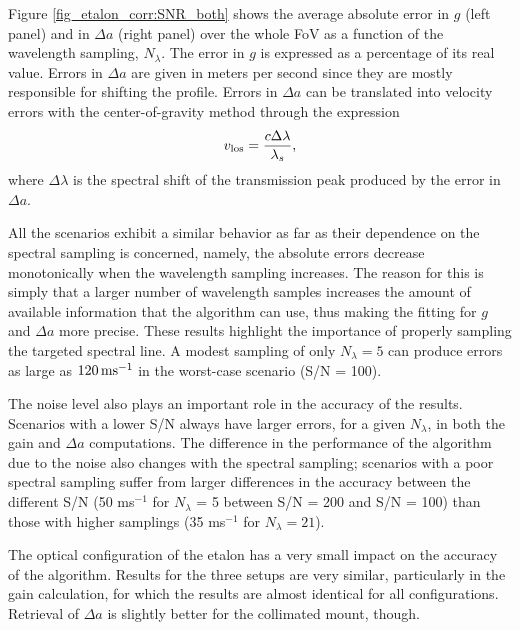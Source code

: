 Figure \ref{fig_etalon_corr:SNR_both} shows the average absolute error in $g$ (left panel) and in $\Delta a$ (right panel) over the whole FoV as a function of the wavelength sampling, $N_\lambda$. The error in $g$ is expressed as a percentage of its real value. Errors in $\Delta a$ are given in meters per second since they are mostly responsible for shifting the profile. Errors in $\Delta a$ can be translated into velocity errors with the center-of-gravity method  \citep{center_of_gravity} through the expression
\begin{equation}
    v_{\rm los} = \frac{c\Delta \lambda}{\lambda_s},
\label{eq_eta_corr:vlos}
\end{equation}
where $\Delta\lambda$ is the spectral shift of the transmission peak produced by the error in $\Delta a$.

All the scenarios exhibit a similar behavior as far as their dependence on the spectral sampling is concerned, namely, the absolute errors decrease monotonically when the wavelength sampling increases. The reason for this is simply that a larger number of wavelength samples increases the amount of available information that the algorithm can use, thus making the fitting for $g$ and $\Delta a$ more precise. These results highlight the importance of properly sampling the targeted spectral line. A modest sampling of only $N_\lambda=5$ can produce errors as large as $120 \, {\rm ms^{-1}}$ in the worst-case scenario (S/N = 100). 

The noise level also plays an important role in the accuracy of the results. Scenarios with a lower S/N always have larger errors, for a given $N_\lambda$, in both the gain and $\Delta a $ computations. The difference in the performance of the algorithm due to the noise also changes with the spectral sampling; scenarios with a poor spectral sampling suffer from larger differences in the accuracy between the different S/N (50 ms$^{-1}$ for $N_\lambda$ = 5 between S/N = 200 and S/N = 100) than those with higher samplings (35 ms$^{-1}$ for $N_\lambda = 21$).

The optical configuration of the etalon has a very small impact on the accuracy of the algorithm. Results for the three setups are very similar, particularly in the gain calculation, for which the results are almost identical for all configurations. Retrieval of $\Delta a$ is slightly better for the collimated mount, though.

